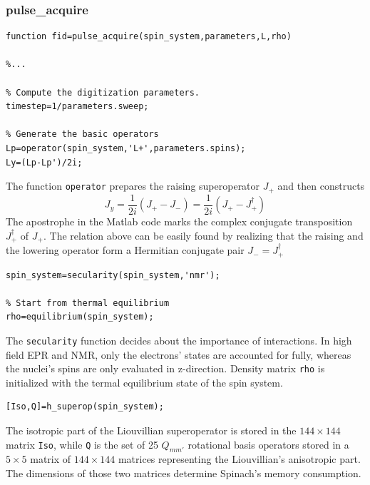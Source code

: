 \documentclass[11.5pt,a4paper]{article}
\begin{document}

\subsubsection{pulse\_acquire}

\begin{lstlisting}
function fid=pulse_acquire(spin_system,parameters,L,rho)

%...

% Compute the digitization parameters.
timestep=1/parameters.sweep;

% Generate the basic operators
Lp=operator(spin_system,'L+',parameters.spins);
Ly=(Lp-Lp')/2i;
\end{lstlisting}
The function \verb$operator$ prepares the raising superoperator $J_+$ and then constructs
\begin{equation}
  J_y = \frac{1}{2i} ( J_+ - J_- ) = \frac{1}{2i} ( J_+ - J_+^\dagger )
\end{equation}
The apostrophe in the Matlab code marks the complex conjugate transposition $J_+^\dagger$ of $J_+$. The relation above can be easily found by realizing that the raising and the lowering operator form a Hermitian conjugate pair $J_- = J_+^\dagger$

\begin{lstlisting}[firstnumber=last]
% Set the secularity assumptions
spin_system=secularity(spin_system,'nmr');

% Start from thermal equilibrium
rho=equilibrium(spin_system);
\end{lstlisting}
The \verb$secularity$ function decides about the importance of interactions. In high field EPR and NMR, only the electrons' states are accounted for fully, whereas the nuclei's spins are only evaluated in z-direction. Density matrix \verb$rho$ is initialized with the termal equilibrium state of the spin system.

\begin{lstlisting}[firstnumber=last]
[Iso,Q]=h_superop(spin_system);
\end{lstlisting}

The isotropic part of the Liouvillian superoperator is stored in the $144\times144$ matrix \verb$Iso$, while \verb$Q$ is the set of 25 $Q_{mm'}$ rotational basis operators stored in a $5\times5$ matrix of $144\times144$ matrices representing the Liouvillian's anisotropic part. The dimensions of those two matrices determine Spinach's memory consumption.
\end{document}
